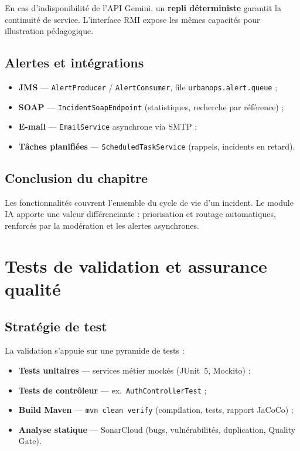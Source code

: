 \documentclass[12pt,a4paper,oneside]{report}
\begin{document}
En cas d'indisponibilité de l'API Gemini, un \textbf{repli déterministe} garantit la continuité de service. L'interface RMI expose les mêmes capacités pour illustration pédagogique.

\section{Alertes et intégrations}

\begin{itemize}[leftmargin=*]
  \item \textbf{JMS} — \texttt{AlertProducer} / \texttt{AlertConsumer}, file \texttt{urbanops.alert.queue} ;
  \item \textbf{SOAP} — \texttt{IncidentSoapEndpoint} (statistiques, recherche par référence) ;
  \item \textbf{E-mail} — \texttt{EmailService} asynchrone via SMTP ;
  \item \textbf{Tâches planifiées} — \texttt{ScheduledTaskService} (rappels, incidents en retard).
\end{itemize}

\section{Conclusion du chapitre}

Les fonctionnalités couvrent l'ensemble du cycle de vie d'un incident. Le module IA apporte une valeur différenciante : priorisation et routage automatiques, renforcés par la modération et les alertes asynchrones.

\chapter{Tests de validation et assurance qualité}

\section{Stratégie de test}

La validation s'appuie sur une pyramide de tests :
\begin{itemize}[leftmargin=*]
  \item \textbf{Tests unitaires} — services métier mockés (JUnit~5, Mockito) ;
  \item \textbf{Tests de contrôleur} — ex.\ \texttt{AuthControllerTest} ;
  \item \textbf{Build Maven} — \texttt{mvn clean verify} (compilation, tests, rapport JaCoCo) ;
  \item \textbf{Analyse statique} — SonarCloud (bugs, vulnérabilités, duplication, Quality Gate).
\end{itemize}
\end{document}
